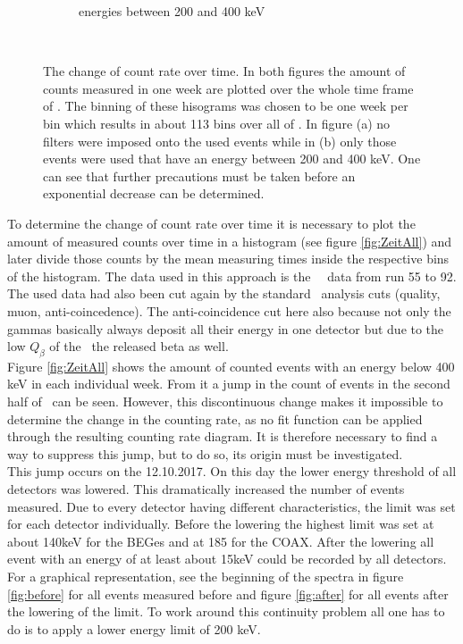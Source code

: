 \begin{figure}[t!]
\begin{subfigure}{.475\textwidth}
		\caption{energies between 200 and 400 keV}
		\label{fig:ZeitLimits}
	\end{subfigure}
	\\
	\caption{
		The change of count rate over time.
		In both figures the amount of counts measured in one week are plotted over the whole time frame of \PII. 
		The binning of these hisograms was chosen to be one week per bin which results in about 113 bins over all of  \PII.
		In figure (a) no filters were imposed onto the used events while in (b) only those events were used that have an energy between 200 and 400 keV. 
		One can see that further precautions must be taken before an exponential decrease can be determined. 
	}
\end{figure}

To determine the change of count rate over time it is necessary to plot the amount of measured counts over time in a histogram (see figure \ref{fig:ZeitAll}) and later divide those counts by the mean measuring times inside the respective bins of the histogram.
The data used in this approach is the \gerda\ \PII\ data from run 55 to 92.
The used data had also been cut again by the standard \gerda\ analysis cuts (quality, muon, anti-coincedence).
The anti-coincidence cut here also because not only the gammas basically always deposit all their energy in one detector but due to the low  $Q_\beta$ of the \Kr\ the released beta as well.
\\

Figure \ref{fig:ZeitAll} shows the amount of counted events with an energy below 400 keV in each individual week.
From it a jump in the count of events in the second half of \PII\ can be seen.
However, this discontinuous change makes it impossible to determine the change in the counting rate, as no fit function can be applied through the resulting counting rate diagram. 
It is therefore necessary to find a way to suppress this jump, but to do so, its origin must be investigated.
\\

This jump occurs on the 12.10.2017.
On this day the lower energy threshold of all detectors was lowered.
This dramatically increased the number of events measured.
Due to every detector having different characteristics, the limit was set for each detector individually.
Before the lowering the highest limit was set at about 140keV for the BEGes and at 185 for the COAX.
After the lowering all event with an energy of at least about 15keV could be recorded by all detectors.
For a graphical representation, see the beginning of the spectra in figure \ref{fig:before} for all events measured before and figure \ref{fig:after} for all events after the lowering of the limit. 
To work around this continuity problem all one has to do is to apply a lower energy limit of 200 keV.
\\


